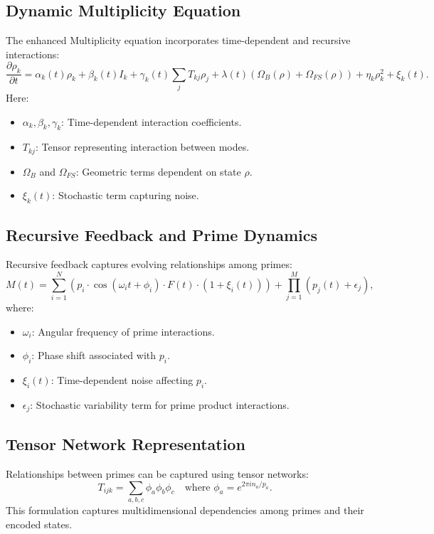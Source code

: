 \documentclass{article}
\theoremstyle{plain}
\begin{document}
\subsection{Dynamic Multiplicity Equation}
The enhanced Multiplicity equation incorporates time-dependent and recursive interactions:
\begin{equation}
\frac{\partial \rho_k}{\partial t} = \alpha_k(t) \rho_k + \beta_k(t) I_k + \gamma_k(t) \sum_{j} T_{kj} \rho_j + \lambda(t) \left(\Omega_B(\rho) + \Omega_{FS}(\rho)\right) + \eta_k \rho_k^2 + \xi_k(t).
\end{equation}
Here:
\begin{itemize}
    \item $\alpha_k, \beta_k, \gamma_k$: Time-dependent interaction coefficients.
    \item $T_{kj}$: Tensor representing interaction between modes.
    \item $\Omega_B$ and $\Omega_{FS}$: Geometric terms dependent on state $\rho$.
    \item $\xi_k(t)$: Stochastic term capturing noise.
\end{itemize}

\subsection{Recursive Feedback and Prime Dynamics}
Recursive feedback captures evolving relationships among primes:
\begin{equation}
M(t) = \sum_{i=1}^N \left( p_i \cdot \cos(\omega_i t + \phi_i) \cdot F(t) \cdot \left(1 + \xi_i(t)\right) \right) + \prod_{j=1}^M \left(p_j(t) + \epsilon_j\right),
\end{equation}
where:
\begin{itemize}
    \item $\omega_i$: Angular frequency of prime interactions.
    \item $\phi_i$: Phase shift associated with $p_i$.
    \item $\xi_i(t)$: Time-dependent noise affecting $p_i$.
    \item $\epsilon_j$: Stochastic variability term for prime product interactions.
\end{itemize}

\subsection{Tensor Network Representation}
Relationships between primes can be captured using tensor networks:
\begin{equation}
T_{ijk} = \sum_{a,b,c} \phi_a \phi_b \phi_c \quad \text{where } \phi_a = e^{2\pi i n_a/p_a}.
\end{equation}
This formulation captures multidimensional dependencies among primes and their encoded states.
\end{document}

